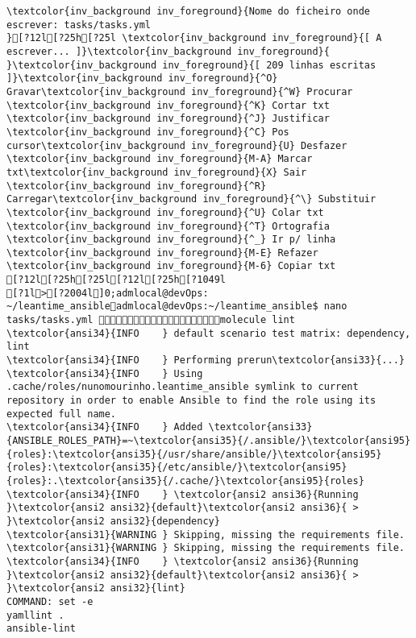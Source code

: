 \documentclass{scrartcl}
\begin{document}
\begin{Verbatim}
\textcolor{inv_background inv_foreground}{Nome do ficheiro onde escrever: tasks/tasks.yml                                                                                           }[?12l[?25h[?25l \textcolor{inv_background inv_foreground}{[ A escrever... ]}\textcolor{inv_background inv_foreground}{          }\textcolor{inv_background inv_foreground}{[ 209 linhas escritas ]}\textcolor{inv_background inv_foreground}{^O} Gravar\textcolor{inv_background inv_foreground}{^W} Procurar      \textcolor{inv_background inv_foreground}{^K} Cortar txt    \textcolor{inv_background inv_foreground}{^J} Justificar    \textcolor{inv_background inv_foreground}{^C} Pos cursor\textcolor{inv_background inv_foreground}{U} Desfazer     \textcolor{inv_background inv_foreground}{M-A} Marcar txt\textcolor{inv_background inv_foreground}{X} Sair    \textcolor{inv_background inv_foreground}{^R} Carregar\textcolor{inv_background inv_foreground}{^\} Substituir    \textcolor{inv_background inv_foreground}{^U} Colar txt     \textcolor{inv_background inv_foreground}{^T} Ortografia    \textcolor{inv_background inv_foreground}{^_} Ir p/ linha   \textcolor{inv_background inv_foreground}{M-E} Refazer      \textcolor{inv_background inv_foreground}{M-6} Copiar txt
[?12l[?25h[?25l[?12l[?25h[?1049l
[?1l>[?2004l]0;admlocal@devOps: ~/leantime_ansibleadmlocal@devOps:~/leantime_ansible$ nano tasks/tasks.yml molecule lint
\textcolor{ansi34}{INFO    } default scenario test matrix: dependency, lint
\textcolor{ansi34}{INFO    } Performing prerun\textcolor{ansi33}{...}
\textcolor{ansi34}{INFO    } Using .cache/roles/nunomourinho.leantime_ansible symlink to current repository in order to enable Ansible to find the role using its expected full name.
\textcolor{ansi34}{INFO    } Added \textcolor{ansi33}{ANSIBLE_ROLES_PATH}=~\textcolor{ansi35}{/.ansible/}\textcolor{ansi95}{roles}:\textcolor{ansi35}{/usr/share/ansible/}\textcolor{ansi95}{roles}:\textcolor{ansi35}{/etc/ansible/}\textcolor{ansi95}{roles}:.\textcolor{ansi35}{/.cache/}\textcolor{ansi95}{roles}
\textcolor{ansi34}{INFO    } \textcolor{ansi2 ansi36}{Running }\textcolor{ansi2 ansi32}{default}\textcolor{ansi2 ansi36}{ > }\textcolor{ansi2 ansi32}{dependency}
\textcolor{ansi31}{WARNING } Skipping, missing the requirements file.
\textcolor{ansi31}{WARNING } Skipping, missing the requirements file.
\textcolor{ansi34}{INFO    } \textcolor{ansi2 ansi36}{Running }\textcolor{ansi2 ansi32}{default}\textcolor{ansi2 ansi36}{ > }\textcolor{ansi2 ansi32}{lint}
COMMAND: set -e
yamllint .
ansible-lint


\end{Verbatim}
\end{document}
